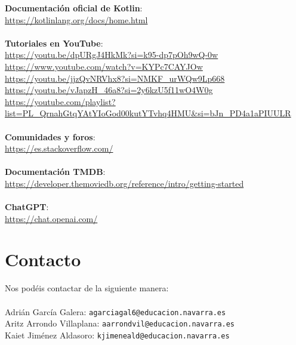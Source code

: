 \documentclass{article}
\begin{document}
    \textbf{Documentación oficial de Kotlin}: \\
    \url{https://kotlinlang.org/docs/home.html} \\
    \\
    \textbf{Tutoriales en YouTube}: \\
    \url{https://youtu.be/dpURgJ4HkMk?si=k95-dp7pOh9wQ-0w} \\
    \url{https://www.youtube.com/watch?v=KYPc7CAYJOw} \\
    \url{https://youtu.be/jjzQvNRVhx8?si=NMKF_urWQw9Lp668} \\
    \url{https://youtu.be/vJapzH_46a8?si=2y6kzU5f11wO4W0g} \\
    \url{https://youtube.com/playlist?list=PL_QrnahGtqYAtYIoGod00kutYTvhq4HMU&si=bJn_PD4a1aPIUULR} \\
    \\
    \textbf{Comunidades y foros}: \\
    \url{https://es.stackoverflow.com/} \\
    \\
    \textbf{Documentación TMDB}: \\
    \url{https://developer.themoviedb.org/reference/intro/getting-started} \\
    \\
    \textbf{ChatGPT}: \\
    \url{https://chat.openai.com/}

\section{Contacto}

    Nos podéis contactar de la siguiente manera:
    \\
    \\
    Adrián García Galera: \texttt{agarciagal6@educacion.navarra.es} \\
    Aritz Arrondo Villaplana: \texttt{aarrondvil@educacion.navarra.es} \\
    Kaiet Jiménez Aldasoro: \texttt{kjimeneald@educacion.navarra.es}
\end{document}
